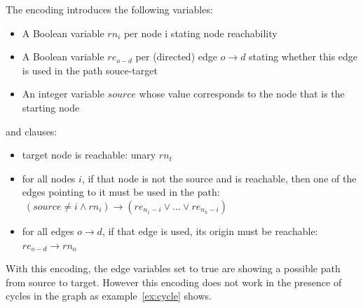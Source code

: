 \documentclass{report}
\theoremstyle{plain}
\begin{document}
The encoding introduces the following variables:
\begin{itemize}
    \item A Boolean variable $rn_i$ per node i stating node reachability
    \item A Boolean variable $re_{o-d}$ per (directed) edge $o\to d$ stating whether this edge is used in the path souce-target
    \item An integer variable $source$ whose value corresponds to the node that is the starting node
\end{itemize}
and clauses:
\begin{itemize}
    \item target node is reachable: unary $rn_t$
    \item for all nodes $i$, if that node is not the source and is reachable, then one of the edges pointing to it must be used in the path: $\ ( source\neq i \wedge rn_i) \to ( re_{n_1-i}  \vee  \dots \vee re_{n_k-i})$
    \item for all edges $o\to d$, if that edge is used, its origin must be reachable: $re_{o-d} \to rn_o$
\end{itemize}

With this encoding, the edge variables set to true are showing a possible path from source to target. However this encoding does not work in the presence of cycles in the graph as example~\ref{ex:cycle} shows.
\vspace{1\baselineskip}


\vspace{1\baselineskip}
\end{document}
